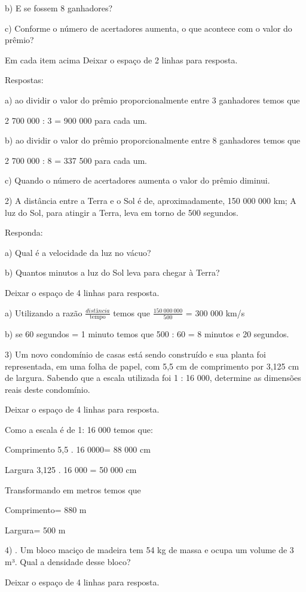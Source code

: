 b) E se fossem 8 ganhadores?

c) Conforme o número de acertadores aumenta, o que acontece com o valor
do prêmio?

Em cada item acima Deixar o espaço de 2 linhas para resposta.

Respostas:

a) ao dividir o valor do prêmio proporcionalmente entre 3 ganhadores
temos que

2 700 000 : 3 = 900 000 para cada um.

b) ao dividir o valor do prêmio proporcionalmente entre 8 ganhadores
temos que

2 700 000 : 8 = 337 500 para cada um.

c) Quando o número de acertadores aumenta o valor do prêmio diminui.

2) A distância entre a Terra e o Sol é de, aproximadamente, 150 000 000
km; A luz do Sol, para atingir a Terra, leva em torno de 500 segundos.

Responda:

a) Qual é a velocidade da luz no vácuo?

b) Quantos minutos a luz do Sol leva para chegar à Terra?

Deixar o espaço de 4 linhas para resposta.

a) Utilizando a razão \(\frac{distância}{\text{tempo}}\) temos que
\(\frac{150\ 000\ 000}{500}\) = 300 000 km/s

b) se 60 segundos = 1 minuto temos que 500 : 60 = 8 minutos e 20
segundos.

3) Um novo condomínio de casas está sendo construído e sua planta foi
representada, em uma folha de papel, com 5,5 cm de comprimento por 3,125
cm de largura. Sabendo que a escala utilizada foi 1 : 16 000, determine
as dimensões reais deste condomínio.

Deixar o espaço de 4 linhas para resposta.

Como a escala é de 1: 16 000 temos que:

Comprimento 5,5 . 16 0000= 88 000 cm

Largura 3,125 . 16 000 = 50 000 cm

Transformando em metros temos que

Comprimento= 880 m

Largura= 500 m

4) . Um bloco maciço de madeira tem 54 kg de massa e ocupa um volume de
3 m³. Qual a densidade desse bloco?

Deixar o espaço de 4 linhas para resposta.

